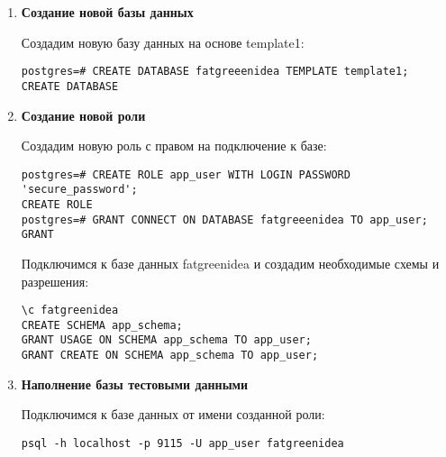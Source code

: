 \begin{enumerate}
\begin{verbatim}
psql -h localhost -p 9115 postgres
\end{verbatim}

Создадим табличное пространство для индексов:

\begin{verbatim}
CREATE TABLESPACE index_space LOCATION '/var/db/postgres1/uhx43';
\end{verbatim}

\begin{verbatim}
[postgres1@pg183 ~/uhx43]$ psql -h localhost -p 9115 postgres
psql (16.4)
Введите "help", чтобы получить справку.

postgres=# CREATE TABLESPACE index_space LOCATION '/var/db/postgres1/uhx43';
CREATE TABLESPACE
\end{verbatim}

\item \textbf{Создание новой базы данных}

Создадим новую базу данных на основе template1:

\begin{verbatim}
postgres=# CREATE DATABASE fatgreeenidea TEMPLATE template1;
CREATE DATABASE
\end{verbatim}

\item \textbf{Создание новой роли}

Создадим новую роль с правом на подключение к базе:

\begin{verbatim}
postgres=# CREATE ROLE app_user WITH LOGIN PASSWORD 'secure_password';
CREATE ROLE
postgres=# GRANT CONNECT ON DATABASE fatgreeenidea TO app_user;
GRANT
\end{verbatim}

Подключимся к базе данных fatgreenidea и создадим необходимые схемы и разрешения:

\begin{verbatim}
\c fatgreenidea
CREATE SCHEMA app_schema;
GRANT USAGE ON SCHEMA app_schema TO app_user;
GRANT CREATE ON SCHEMA app_schema TO app_user;
\end{verbatim}

\item \textbf{Наполнение базы тестовыми данными}

Подключимся к базе данных от имени созданной роли:

\begin{verbatim}
psql -h localhost -p 9115 -U app_user fatgreenidea
\end{verbatim}


\end{enumerate}
